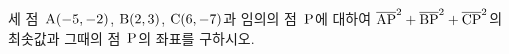 세 점~$\mathrm{A}(-5{,}\mkern3mu\mathopen{}-2)$, $\mathrm{B}(2{,}\mkern3mu\mathopen{}3)$, $\mathrm{C}(6{,}\mkern3mu\mathopen{}-7)$과 임의의 점~$\mathrm{P}$에 대하여 $\overline{\mathrm{AP}}^2+\overline{\mathrm{BP}}^2+\overline{\mathrm{CP}}^2$의 최솟값과 그때의 점~$\mathrm{P}$의 좌표를 구하시오.
